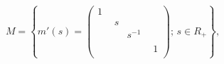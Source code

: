 $$
{M} =
\left\{ m'(s)=
\begin{pmatrix}
1& &  \\
 &    \begin{smallmatrix} s &  \\  & s^{-1}
 \end{smallmatrix}     &  \\
 &         & 1\\
\end{pmatrix}; \, s \in R_+
 \right\},
$$